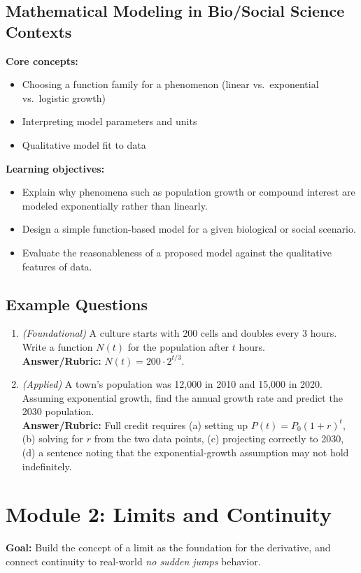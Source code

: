\documentclass{article}
\begin{document}
\subsection{Mathematical Modeling in Bio/Social Science Contexts}
\textbf{Core concepts:}
\begin{itemize}[leftmargin=*]
  \item Choosing a function family for a phenomenon (linear vs.\ exponential vs.\ logistic growth)
  \item Interpreting model parameters and units
  \item Qualitative model fit to data
\end{itemize}
\textbf{Learning objectives:}
\begin{itemize}[leftmargin=*]
  \item Explain why phenomena such as population growth or compound interest are modeled exponentially rather than linearly.
  \item Design a simple function-based model for a given biological or social scenario.
  \item Evaluate the reasonableness of a proposed model against the qualitative features of data.
\end{itemize}

\subsection*{Example Questions}
\begin{enumerate}[leftmargin=*]
  \item \textit{(Foundational)} A culture starts with 200 cells and doubles every 3 hours. Write a function $N(t)$ for the population after $t$ hours. \\
  \textbf{Answer/Rubric:} $N(t) = 200 \cdot 2^{t/3}$.
  \item \textit{(Applied)} A town's population was 12{,}000 in 2010 and 15{,}000 in 2020. Assuming exponential growth, find the annual growth rate and predict the 2030 population. \\
  \textbf{Answer/Rubric:} Full credit requires (a) setting up $P(t)=P_0(1+r)^t$, (b) solving for $r$ from the two data points, (c) projecting correctly to 2030, (d) a sentence noting that the exponential-growth assumption may not hold indefinitely.
\end{enumerate}


\section{Module 2: Limits and Continuity}
\textbf{Goal:} Build the concept of a limit as the foundation for the derivative, and connect continuity to real-world \emph{no sudden jumps} behavior.
\end{document}
